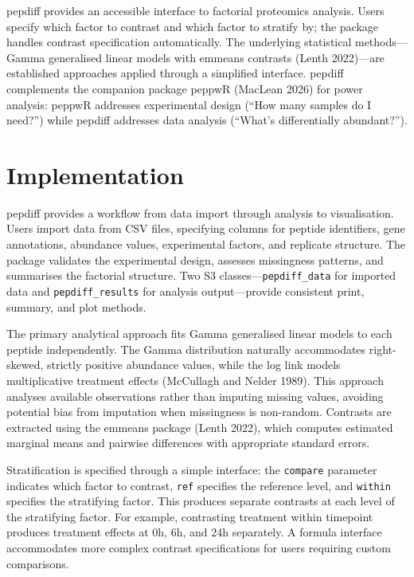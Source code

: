 \documentclass[
]{article}
\begin{document}
pepdiff provides an accessible interface to factorial proteomics
analysis. Users specify which factor to contrast and which factor to
stratify by; the package handles contrast specification automatically.
The underlying statistical methods---Gamma generalised linear models
with emmeans contrasts (Lenth 2022)---are established approaches applied
through a simplified interface. pepdiff complements the companion
package peppwR (MacLean 2026) for power analysis: peppwR addresses
experimental design (``How many samples do I need?'') while pepdiff
addresses data analysis (``What's differentially abundant?'').

\section{Implementation}\label{implementation}

pepdiff provides a workflow from data import through analysis to
visualisation. Users import data from CSV files, specifying columns for
peptide identifiers, gene annotations, abundance values, experimental
factors, and replicate structure. The package validates the experimental
design, assesses missingness patterns, and summarises the factorial
structure. Two S3 classes---\texttt{pepdiff\_data} for imported data and
\texttt{pepdiff\_results} for analysis output---provide consistent
print, summary, and plot methods.

The primary analytical approach fits Gamma generalised linear models to
each peptide independently. The Gamma distribution naturally
accommodates right-skewed, strictly positive abundance values, while the
log link models multiplicative treatment effects (McCullagh and Nelder
1989). This approach analyses available observations rather than
imputing missing values, avoiding potential bias from imputation when
missingness is non-random. Contrasts are extracted using the emmeans
package (Lenth 2022), which computes estimated marginal means and
pairwise differences with appropriate standard errors.

Stratification is specified through a simple interface: the
\texttt{compare} parameter indicates which factor to contrast,
\texttt{ref} specifies the reference level, and \texttt{within}
specifies the stratifying factor. This produces separate contrasts at
each level of the stratifying factor. For example, contrasting treatment
within timepoint produces treatment effects at 0h, 6h, and 24h
separately. A formula interface accommodates more complex contrast
specifications for users requiring custom comparisons.
\end{document}
